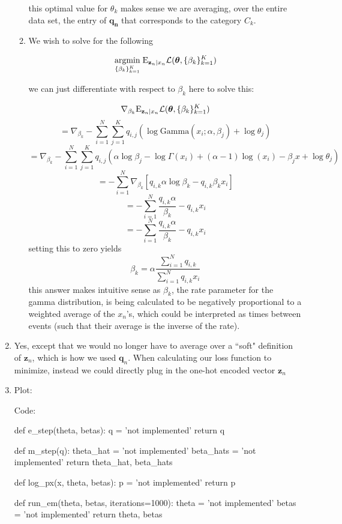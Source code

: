 \documentclass[submit]{harvardml}
\begin{document}
\begin{enumerate}
\begin{enumerate}
      this optimal value for $\theta_k$ makes sense we are averaging, over the entire data set,
      the entry of $\mathbf{q_n}$ that corresponds to the category $C_k$.

      \item
    
      We wish to solve for the following
      
      $$\underset{\{\beta_k\}^K_{k=1}}{\mathrm{argmin}}\;\mathrm{E}_{\mathbf{z}_n|x_n}\mathcal{L}(\boldsymbol{\theta},\{\beta_k\}^K_{k=1})$$
      
      we can just differentiate with respect to $\beta_k$ here to solve this:

      $$\nabla_{\beta_k}\mathrm{E}_{\mathbf{z}_n|x_n}\mathcal{L}(\boldsymbol{\theta},\{\beta_k\}^K_{k=1}) $$
      $$=\nabla_{\beta_k}-\sum_{i=1}^N\sum_{j=1}^K q_{i,j}\left(\log\mathrm{Gamma}(x_i;\alpha,\beta_j)+\log \theta_j\right)$$
      $$=\nabla_{\beta_k} -\sum_{i=1}^N\sum_{j=1}^K q_{i,j}\left(\alpha\log\beta_j-\log\Gamma(x_i)+(\alpha-1)\log(x_i)-\beta_j x+\log \theta_j\right) $$
      $$=-\sum_{i=1}^N \nabla_{\beta_k} [q_{i,k}\alpha\log\beta_k-q_{i,k}\beta_k x_i]$$
      $$=-\sum_{i=1}^N \frac{q_{i,k}\alpha }{\beta_k} - q_{i,k}x_i$$
      $$=-\sum_{i=1}^N \frac{q_{i,k}\alpha }{\beta_k} - q_{i,k}x_i$$
      setting this to zero yields
      $$\boxed{\beta_k = \alpha\frac{\sum_{i=1}^N q_{i,k}}{\sum_{i=1}^N q_{i,k}x_i}}$$
      this answer makes intuitive sense as $\beta_k$, the rate parameter for the gamma distribution,
      is being calculated to be negatively proportional to a weighted average of the $x_n$'s, which
      could be interpreted as times between events (such that their average is the inverse of the rate). 

    \end{enumerate}
  \item 
  Yes, except that we would no longer have to average over a ``soft" definition of $\mathbf{z}_n$, which
  is how we used $\mathbf{q}_n$.
  When calculating our loss function to minimize, instead we could directly plug in the one-hot encoded
  vector $\mathbf{z}_n$
  
  
  \item 
    Plot:


    Code:

    \begin{python}
def e_step(theta, betas):
    q = 'not implemented'
    return q


def m_step(q):
    theta_hat = 'not implemented'
    beta_hats = 'not implemented'
    return theta_hat, beta_hats


def log_px(x, theta, betas):
    p = 'not implemented'
    return p


def run_em(theta, betas, iterations=1000):
    theta = 'not implemented'
    betas = 'not implemented'
    return theta, betas
    \end{python}
\end{enumerate}
\end{document}
